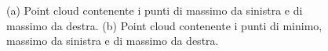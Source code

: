 \begin{figure}[H]
	\centering
	\hspace{1em}
	\caption{(a) Point cloud contenente i punti di massimo da sinistra e di massimo da destra. (b) Point cloud contenente i punti di minimo, massimo da sinistra e di massimo da destra.}\label{fig:battistrada_maxr_maxl_0.3}
\end{figure}
